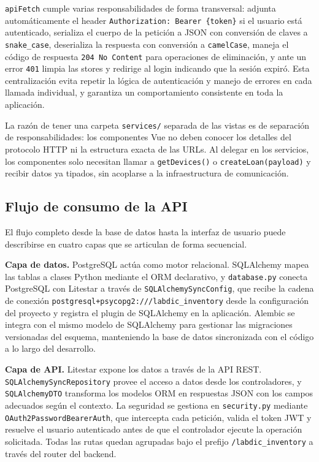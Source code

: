 \texttt{apiFetch} cumple varias responsabilidades de forma transversal: adjunta 
automáticamente el header \texttt{Authorization: Bearer \{token\}} si el usuario 
está autenticado, serializa el cuerpo de la petición a JSON con conversión de claves 
a \texttt{snake\_case}, deserializa la respuesta con conversión a \texttt{camelCase}, 
maneja el código de respuesta \texttt{204 No Content} para operaciones de eliminación, 
y ante un error \texttt{401} limpia las stores y redirige al login indicando que la 
sesión expiró. Esta centralización evita repetir la lógica de autenticación y manejo 
de errores en cada llamada individual, y garantiza un comportamiento consistente en 
toda la aplicación.

La razón de tener una carpeta \texttt{services/} separada de las vistas es de 
separación de responsabilidades: los componentes Vue no deben conocer los detalles 
del protocolo HTTP ni la estructura exacta de las URLs. Al delegar en los servicios, 
los componentes solo necesitan llamar a \texttt{getDevices()} o 
\texttt{createLoan(payload)} y recibir datos ya tipados, sin acoplarse a la 
infraestructura de comunicación.

\subsection{Flujo de consumo de la API}\label{sec:flujo_api}

El flujo completo desde la base de datos hasta la interfaz de usuario puede 
describirse en cuatro capas que se articulan de forma secuencial.

\textbf{Capa de datos.} PostgreSQL actúa como motor relacional. SQLAlchemy mapea 
las tablas a clases Python mediante el ORM declarativo, y \texttt{database.py} 
conecta PostgreSQL con Litestar a través de \texttt{SQLAlchemySyncConfig}, que 
recibe la cadena de conexión \texttt{postgresql+psycopg2:///labdic\_inventory} 
desde la configuración del proyecto y registra el plugin de SQLAlchemy en la 
aplicación. Alembic se integra con el mismo modelo de SQLAlchemy para gestionar 
las migraciones versionadas del esquema, manteniendo la base de datos sincronizada 
con el código a lo largo del desarrollo.

\textbf{Capa de API.} Litestar expone los datos a través de la API REST. 
\texttt{SQLAlchemySyncRepository} provee el acceso a datos desde los controladores, 
y \texttt{SQLAlchemyDTO} transforma los modelos ORM en respuestas JSON con los 
campos adecuados según el contexto. La seguridad se gestiona en \texttt{security.py} 
mediante \texttt{OAuth2PasswordBearerAuth}, que intercepta cada petición, valida el 
token JWT y resuelve el usuario autenticado antes de que el controlador ejecute la 
operación solicitada. Todas las rutas quedan agrupadas bajo el prefijo 
\texttt{/labdic\_inventory} a través del router del backend.

